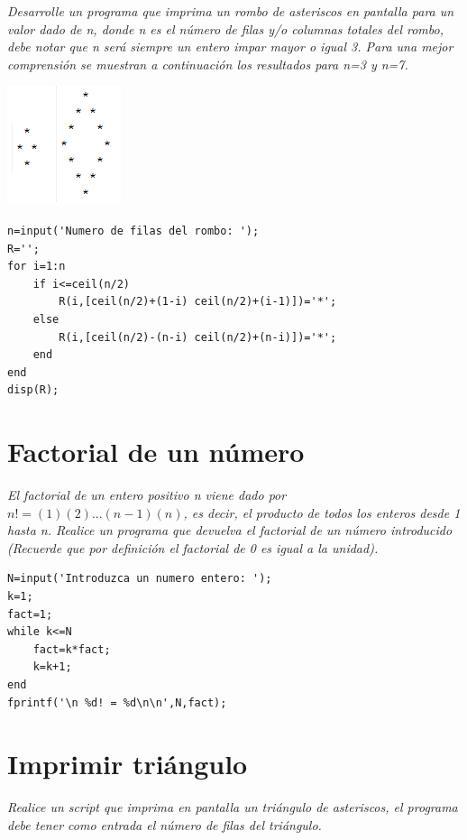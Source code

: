 \textit{Desarrolle un programa que imprima un rombo de asteriscos en pantalla para un valor 
dado de n, donde n es el número de filas y/o columnas totales del rombo, debe notar que n será 
siempre un entero impar mayor o igual 3. Para una mejor comprensión se muestran a continuación 
los resultados para n=3 y n=7.}

\begin{center}
\includegraphics[scale=1]{src/rombo.png}
\end{center}

\sol

\begin{verbatim}
n=input('Numero de filas del rombo: ');
R='';
for i=1:n
    if i<=ceil(n/2)
        R(i,[ceil(n/2)+(1-i) ceil(n/2)+(i-1)])='*';
    else
        R(i,[ceil(n/2)-(n-i) ceil(n/2)+(n-i)])='*';
    end
end
disp(R);
\end{verbatim}

\section{Factorial de un número}

\textit{El factorial de un entero positivo n viene dado por $n!=(1)(2)...(n-1)(n)$, es decir, el producto 
de todos los enteros desde 1 hasta n. Realice un programa que devuelva el factorial de un número 
introducido (Recuerde que por definición el factorial de 0 es igual a la unidad).}

\sol

\begin{verbatim}
N=input('Introduzca un numero entero: ');
k=1;
fact=1;
while k<=N
    fact=k*fact;
    k=k+1;
end
fprintf('\n %d! = %d\n\n',N,fact);
\end{verbatim}


\section{Imprimir triángulo}

\textit{Realice un script que imprima en pantalla un triángulo de asteriscos, el programa debe tener como entrada el número de filas del triángulo.}

